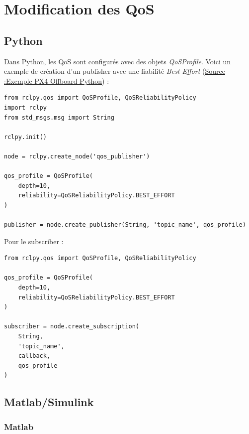 \chapter{Modification des QoS}
\label{annexe:qos}

\section{Python}

Dans Python, les QoS sont configurés avec des objets \textit{QoSProfile}. Voici un exemple de création d’un publisher avec une fiabilité \textit{Best Effort} (\underline{Source :}\href{https://github.com/PX4/px4_ros_com/blob/e18248db6211350e6a418cb08ae38f64c314a2f4/src/examples/offboard_py/offboard_control.py}{Exemple PX4 Offboard Python})
 :

\begin{lstlisting}[style=commandstyle, caption={Publisher avec QoS personnalisé}]
from rclpy.qos import QoSProfile, QoSReliabilityPolicy
import rclpy
from std_msgs.msg import String

rclpy.init()

node = rclpy.create_node('qos_publisher')

qos_profile = QoSProfile(
    depth=10,
    reliability=QoSReliabilityPolicy.BEST_EFFORT
)

publisher = node.create_publisher(String, 'topic_name', qos_profile)
\end{lstlisting}

\noindent Pour le subscriber :

\begin{lstlisting}[style=commandstyle, caption={Subscriber avec QoS personnalisé}]
from rclpy.qos import QoSProfile, QoSReliabilityPolicy

qos_profile = QoSProfile(
    depth=10,
    reliability=QoSReliabilityPolicy.BEST_EFFORT
)

subscriber = node.create_subscription(
    String,
    'topic_name',
    callback,
    qos_profile
)
\end{lstlisting}

\newpage
\section{Matlab/Simulink}

\subsection{Matlab}

